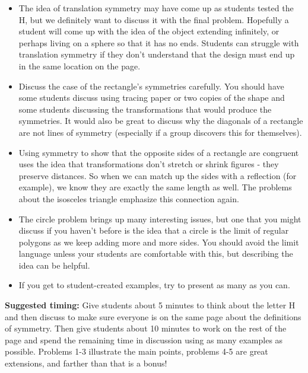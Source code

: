 \documentclass[nooutcomes, noauthor, handout]{ximera}
\begin{document}
\begin{instructorNotes}
\begin{itemize}
	\item The idea of translation symmetry may have come up as students tested the H, but we definitely want to discuss it with the final problem. Hopefully a student will come up with the idea of the object extending infinitely, or perhaps living on a sphere so that it has no ends. Students can struggle with translation symmetry if they don't understand that the design must end up in the same location on the page. 
	\item Discuss the case of the rectangle's symmetries carefully. You should have some students discuss using tracing paper or two copies of the shape and some students discussing the transformations that would produce the symmetries. It would also be great to discuss why the diagonals of a rectangle are not lines of symmetry (especially if a group discovers this for themselves).
	\item Using symmetry to show that the opposite sides of a rectangle are congruent uses the idea that transformations don't stretch or shrink figures - they preserve distances. So when we can match up the sides with a reflection (for example), we know they are exactly the same length as well. The problems about the isosceles triangle emphasize this connection again.
	\item The circle problem brings up many interesting issues, but one that you might discuss if you haven't before is the idea that a circle is the limit of regular polygons as we keep adding more and more sides. You should avoid the limit language unless your students are comfortable with this, but describing the idea can be helpful.
	\item If you get to student-created examples, try to present as many as you can.
\end{itemize}


{\bf Suggested timing:} Give students about 5 minutes to think about the letter H and then discuss to make sure everyone is on the same page about the definitions of symmetry. Then give students about 10 minutes to work on the rest of the page and spend the remaining time in discussion using as many examples as possible. Problems 1-3 illustrate the main points, problems 4-5 are great extensions, and farther than that is a bonus!
\end{instructorNotes}
\end{document}
